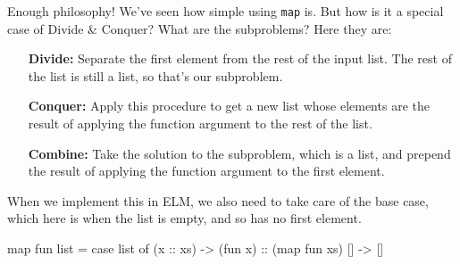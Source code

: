 \documentclass[12pt]{amsbook}
\begin{document}
\medskip
Enough philosophy!  We've seen how simple using  \texttt{map} is. 
But how is it a special case of Divide \& Conquer?
What are the subproblems?  Here they are:
\begin{itemize}
\item[\textbf{Divide:}]  Separate the first element from the rest of the input list.  The rest of the list is still a list, so that's our subproblem.
\item[\textbf{Conquer:}]  Apply this procedure to get a new list whose elements are the result of applying the function argument to the rest of the list.
\item[\textbf{Combine:}]  Take the solution to the subproblem, which is a list, and prepend the result of applying the function argument to the first element.
\end{itemize}
When we implement this in ELM, we also need to take care of the base case, which here is when the list is empty, and so has no first element.
\begin{code}
map fun list = case list of
                 (x :: xs) -> (fun x) :: (map fun xs)
                 []        -> []
\end{code}
\end{document}
